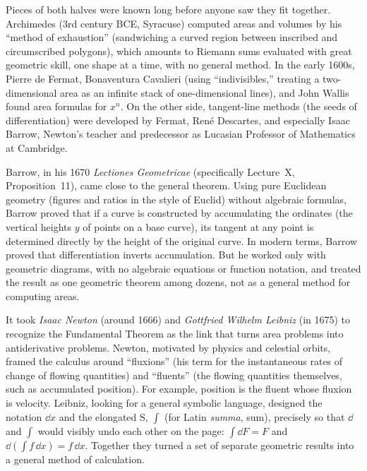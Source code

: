\begin{historybox}
Pieces of both halves were known long before anyone saw they fit together.
Archimedes (3rd century BCE, Syracuse) computed areas and volumes by his
``method of exhaustion'' (sandwiching a curved region between inscribed and
circumscribed polygons), which amounts to Riemann sums evaluated with great
geometric skill, one shape at a time, with no general method. In the early
1600s, Pierre de Fermat, Bonaventura Cavalieri (using ``indivisibles,'' treating
a two-dimensional area as an infinite stack of one-dimensional lines), and John
Wallis found area formulas for $x^n$. On the other side, tangent-line methods
(the seeds of differentiation) were developed by Fermat, Ren\'e Descartes, and
especially Isaac Barrow, Newton's teacher and predecessor as Lucasian Professor
of Mathematics at Cambridge.

Barrow, in his 1670 \emph{Lectiones Geometricae} (specifically Lecture~X,
Proposition~11), came close to the general theorem. Using pure Euclidean
geometry (figures and ratios in the style of Euclid) without algebraic formulas, Barrow proved that if a curve is
constructed by accumulating the ordinates (the vertical heights $y$ of points on
a base curve), its tangent at any point is determined directly by the height of
the original curve. In modern terms, Barrow proved that differentiation inverts
accumulation. But he worked only with geometric diagrams, with no algebraic
equations or function notation, and treated the result as one geometric theorem
among dozens, not as a general method for computing areas.

It took \emph{Isaac Newton} (around 1666)
and \emph{Gottfried Wilhelm Leibniz} (in 1675) to recognize the Fundamental
Theorem as the link that turns area problems into antiderivative problems. Newton,
motivated by physics and
celestial orbits, framed the calculus around ``fluxions'' (his term for the
instantaneous rates of change of flowing quantities) and ``fluents'' (the flowing
quantities themselves, such as accumulated position). For example, position is
the fluent whose fluxion is velocity. Leibniz, looking for a general symbolic
language, designed the notation $\dd x$ and the elongated S,
$\int$ (for Latin \emph{summa}, sum), precisely so that $\dd$ and $\int$
would visibly undo each other on the page: $\int \dd F = F$ and
$\dd(\int f\,\dd x) = f\,\dd x$. Together they turned a set of separate geometric
results into a general method of calculation.


\end{historybox}
